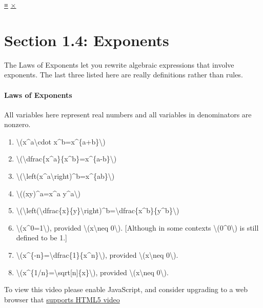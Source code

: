 \protect\hyperlink{main-nav}{≡} \protect\hyperlink{close-nav}{×}

\hypertarget{section-1.4-exponents}{%
\section{Section 1.4: Exponents}\label{section-1.4-exponents}}

The Laws of Exponents let you rewrite algebraic expressions that involve
exponents. The last three listed here are really definitions rather than
rules.

\hypertarget{laws-of-exponents}{%
\paragraph{Laws of Exponents}\label{laws-of-exponents}}

All variables here represent real numbers and all variables in
denominators are nonzero.

\begin{enumerate}
\tightlist
\item
  \textbackslash{}(x\^{}a\textbackslash{}cdot
  x\^{}b=x\^{}\{a+b\}\textbackslash{})
\item
  \textbackslash{}(\textbackslash{}dfrac\{x\^{}a\}\{x\^{}b\}=x\^{}\{a-b\}\textbackslash{})
\item
  \textbackslash{}(\textbackslash{}left(x\^{}a\textbackslash{}right)\^{}b=x\^{}\{ab\}\textbackslash{})
\item
  \textbackslash{}((xy)\^{}a=x\^{}a y\^{}a\textbackslash{})
\item
  \textbackslash{}(\textbackslash{}left(\textbackslash{}dfrac\{x\}\{y\}\textbackslash{}right)\^{}b=\textbackslash{}dfrac\{x\^{}b\}\{y\^{}b\}\textbackslash{})
\item
  \textbackslash{}(x\^{}0=1\textbackslash{}), provided
  \textbackslash{}(x\textbackslash{}neq 0\textbackslash{}). {[}Although
  in some contexts \textbackslash{}(0\^{}0\textbackslash{}) is still
  defined to be 1.{]}
\item
  \textbackslash{}(x\^{}\{-n\}=\textbackslash{}dfrac\{1\}\{x\^{}n\}\textbackslash{}),
  provided \textbackslash{}(x\textbackslash{}neq 0\textbackslash{}).
\item
  \textbackslash{}(x\^{}\{1/n\}=\textbackslash{}sqrt{[}n{]}\{x\}\textbackslash{}),
  provided \textbackslash{}(x\textbackslash{}neq 0\textbackslash{}).
\end{enumerate}

To view this video please enable JavaScript, and consider upgrading to a
web browser that \href{http://videojs.com/html5-video-support/}{supports
HTML5 video}

